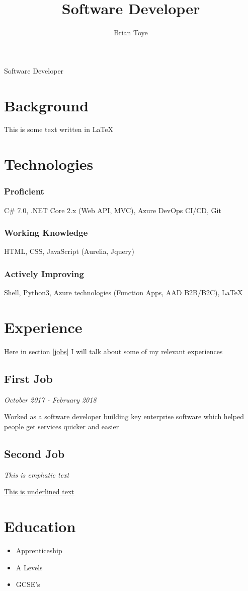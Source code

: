 \documentclass{article}
\author{Brian Toye}
\title{Software Developer}
\renewcommand{\maketitle}{
\begin{center}
{\huge\bfseries
\theauthor}

\vspace{.25em}

Software Developer
\end{center}
}
\begin{document}
\maketitle

\section{Background}

This is some text written in {\LaTeX}

\section{Technologies}

\subsubsection{Proficient}
C\# 7.0, .NET Core 2.x (Web API, MVC), Azure DevOps CI/CD, Git

\subsubsection{Working Knowledge}
HTML, CSS, JavaScript (Aurelia, Jquery)

\subsubsection{Actively Improving}
Shell, Python3, Azure technologies (Function Apps, AAD B2B/B2C), {\LaTeX}

\section{Experience\label{jobs}}

Here in section \ref{jobs} I will talk about some of my relevant experiences

\subsection{First Job}

\textit {October 2017 - February 2018}

Worked as a software developer building key enterprise software which helped people get services quicker and easier

\subsection{Second Job}

\emph{This is emphatic text}

\underline{This is underlined text}

\section{Education}

\begin{itemize}
\item Apprenticeship
\item A Levels
\item GCSE's
\end{itemize}
\end{document}
